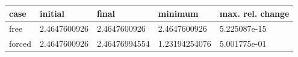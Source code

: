\begin{center}\small
\begin{tabular}{lllll}
\toprule
case & initial & final & minimum & max. rel. change\\
\midrule
free & 2.4647600926 & 2.4647600926 & 2.4647600926 & 5.225087e-15\\
forced & 2.4647600926 & 2.46476994554 & 1.23194254076 & 5.001775e-01\\
\bottomrule
\end{tabular}\end{center}

